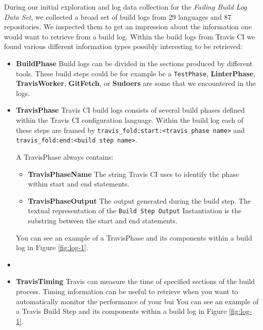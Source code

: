 \documentclass[\myrootdir/main.tex]{subfiles}
\begin{document}
During our initial exploration and log data collection for the \emph{Failing Build Log Data Set}, we collected a broad set of build logs from 29 languages and 87 repositories.
We inspected them to get an impression about the information one would want to retrieve from a build log.
Within the build logs from Travis CI we found various different information types possibly interesting to be retrieved:

\begin{itemize}
	\item \textbf{BuildPhase} Build logs can be divided in the sections produced by different tools.
	      These build steps could be for example be a \texttt{TestPhase}, \textbf{LinterPhase}, \textbf{TravisWorker}, \textbf{GitFetch}, or \textbf{Sudoers} are some that we encountered in the logs.

	\item \textbf{TravisPhase} Travis CI build logs consists of several build phases defined within the Travis CI configuration language. Within the build log each of these steps are framed by \lstinline{travis_fold:start:<travis phase name>} and \\ \lstinline{travis_fold:end:<build step name>}.

	      A TravisPhase always contains:
	      \begin{itemize}
		      \item \textbf{TravisPhaseName} The string Travis CI uses to identify the phase within start and end statements.
		      \item \textbf{TravisPhaseOutput} The output generated during the build step. The textual representation of the \texttt{Build Step Output} Instantiation is the substring between the start and end statements.
	      \end{itemize}
	      You can see an example of a TravisPhase and its components within a build log in Figure \ref{fig:log-1}.

	\item
	\item \textbf{TravisTiming} Travis can measure the time of specified sections of the build process.
	      Timing information can be useful to retrieve when you want to automatically monitor the performance of your bui
	      You can see an example of a Travis Build Step and its components within a build log in Figure \ref{fig:log-1}.


\end{itemize}
\end{document}
